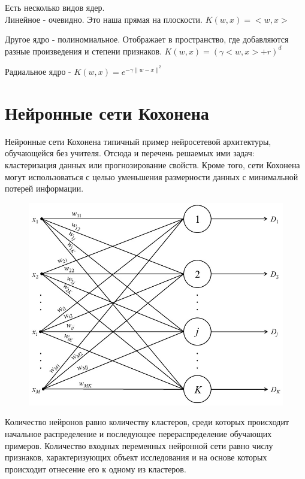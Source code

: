 \documentclass[paper=a4, fontsize=11pt]{scrartcl} %
\numberwithin{equation}{section} %
\numberwithin{figure}{section} %
\numberwithin{table}{section} %
\begin{document}
	Есть несколько видов ядер.\\
	
	Линейное - очевидно. Это наша прямая на плоскости. $K(w,x) = <w,x>$
	
	Другое ядро - полиномиальное. Отображает в пространство, где добавляются разные произведения и степени признаков. $K(w,x) = (\gamma <w,x> + r)^d$
	
	Радиальное ядро - $K(w,x) = e^{-\gamma \|w - x\|^2}$
	
	\section{Нейронные сети Кохонена}
	Нейронные сети Кохонена типичный пример нейросетевой архитектуры, обучающейся без учителя. Отсюда и перечень решаемых ими задач: кластеризация данных или прогнозирование свойств. Кроме того, сети Кохонена могут использоваться с целью уменьшения размерности данных с минимальной потерей информации.
	
	\begin{figure}[h!]
		\centering
		\includegraphics[scale=0.35]{koh}
	\end{figure}
	
	Количество нейронов равно количеству кластеров, среди которых происходит начальное распределение и последующее перераспределение обучающих примеров. Количество входных переменных нейронной сети равно числу признаков, характеризующих объект исследования и на основе которых происходит отнесение его к одному из кластеров.
	
\end{document}
